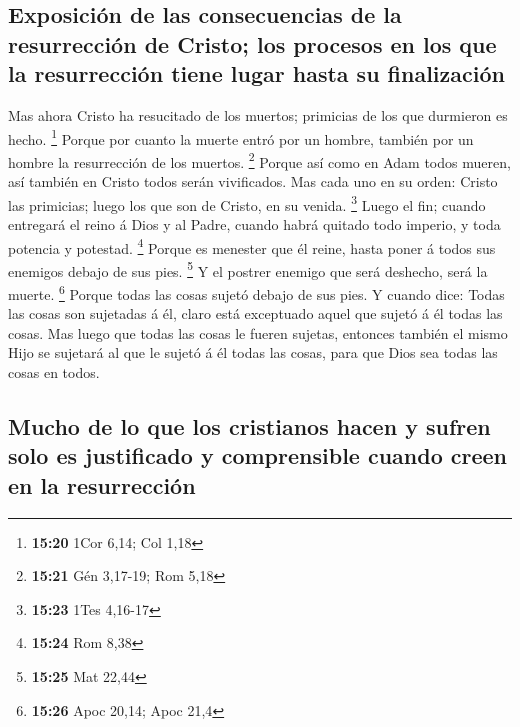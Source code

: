 \hypertarget{exposiciuxf3n-de-las-consecuencias-de-la-resurrecciuxf3n-de-cristo-los-procesos-en-los-que-la-resurrecciuxf3n-tiene-lugar-hasta-su-finalizaciuxf3n}{%
\subsection{Exposición de las consecuencias de la resurrección de
Cristo; los procesos en los que la resurrección tiene lugar hasta su
finalización}\label{exposiciuxf3n-de-las-consecuencias-de-la-resurrecciuxf3n-de-cristo-los-procesos-en-los-que-la-resurrecciuxf3n-tiene-lugar-hasta-su-finalizaciuxf3n}}

 Mas ahora Cristo ha resucitado de los muertos; primicias
de los que durmieron es hecho. \footnote{\textbf{15:20} 1Cor 6,14; Col
  1,18}  Porque por cuanto la muerte entró por un hombre,
también por un hombre la resurrección de los muertos. \footnote{\textbf{15:21}
  Gén 3,17-19; Rom 5,18}  Porque así como en Adam todos
mueren, así también en Cristo todos serán vivificados. 
Mas cada uno en su orden: Cristo las primicias; luego los que son de
Cristo, en su venida. \footnote{\textbf{15:23} 1Tes 4,16-17}
 Luego el fin; cuando entregará el reino á Dios y al
Padre, cuando habrá quitado todo imperio, y toda potencia y potestad.
\footnote{\textbf{15:24} Rom 8,38}  Porque es menester
que él reine, hasta poner á todos sus enemigos debajo de sus pies.
\footnote{\textbf{15:25} Mat 22,44}  Y el postrer enemigo
que será deshecho, será la muerte. \footnote{\textbf{15:26} Apoc 20,14;
  Apoc 21,4}  Porque todas las cosas sujetó debajo de sus
pies. Y cuando dice: Todas las cosas son sujetadas á él, claro está
exceptuado aquel que sujetó á él todas las cosas.  Mas
luego que todas las cosas le fueren sujetas, entonces también el mismo
Hijo se sujetará al que le sujetó á él todas las cosas, para que Dios
sea todas las cosas en todos.

\hypertarget{mucho-de-lo-que-los-cristianos-hacen-y-sufren-solo-es-justificado-y-comprensible-cuando-creen-en-la-resurrecciuxf3n}{%
\subsection{Mucho de lo que los cristianos hacen y sufren solo es
justificado y comprensible cuando creen en la
resurrección}\label{mucho-de-lo-que-los-cristianos-hacen-y-sufren-solo-es-justificado-y-comprensible-cuando-creen-en-la-resurrecciuxf3n}}

